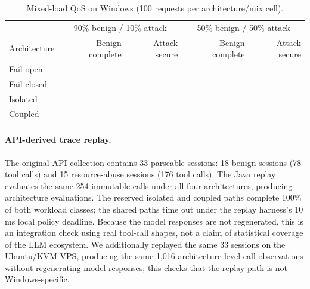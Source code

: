 \begin{table}[t]
\centering
\small
\caption{Mixed-load QoS on Windows (100 requests per architecture/mix cell).}
\label{tab:qos}
\begin{tabular}{lrrrr}
\toprule
 & \multicolumn{2}{c}{90\% benign / 10\% attack} & \multicolumn{2}{c}{50\% benign / 50\% attack} \\
Architecture & Benign complete & Attack secure & Benign complete & Attack secure \\
\midrule
Fail-open  & \ComputingQosFailOpenBninetyBenignCompletion{} & \ComputingQosFailOpenBninetyAttackSecure{} & \ComputingQosFailOpenBfiftyBenignCompletion{} & \ComputingQosFailOpenBfiftyAttackSecure{} \\
Fail-closed & \ComputingQosFailClosedBninetyBenignCompletion{} & \ComputingQosFailClosedBninetyAttackSecure{} & \ComputingQosFailClosedBfiftyBenignCompletion{} & \ComputingQosFailClosedBfiftyAttackSecure{} \\
Isolated   & \ComputingQosIsolatedBninetyBenignCompletion{} & \ComputingQosIsolatedBninetyAttackSecure{} & \ComputingQosIsolatedBfiftyBenignCompletion{} & \ComputingQosIsolatedBfiftyAttackSecure{} \\
Coupled    & \ComputingQosCoupledBninetyBenignCompletion{} & \ComputingQosCoupledBninetyAttackSecure{} & \ComputingQosCoupledBfiftyBenignCompletion{} & \ComputingQosCoupledBfiftyAttackSecure{} \\
\bottomrule
\end{tabular}
\end{table}

\paragraph{API-derived trace replay.}
The original API collection contains 33 parseable sessions: 18 benign
sessions (78 tool calls) and 15 resource-abuse sessions (176 tool calls).
The Java replay evaluates the same 254 immutable calls under all four
architectures, producing \LlmReplayCalls{} architecture evaluations. The
reserved isolated and coupled paths complete 100\% of both workload classes;
the shared paths time out under the replay harness's 10\,ms local policy
deadline. Because the model responses are not regenerated, this is an
integration check using real tool-call shapes, not a claim of statistical
coverage of the LLM ecosystem. We additionally replayed the same 33 sessions
on the Ubuntu/KVM VPS, producing the same 1,016 architecture-level call
observations without regenerating model responses; this checks that the replay
path is not Windows-specific.

